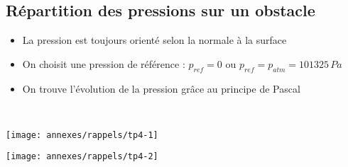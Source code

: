 \subsection*{Répartition des pressions sur un obstacle}
\begin{itemize}
	\item La pression est toujours orienté selon la normale à la surface
	\item On choisit une pression de référence : $p_{ref} = 0$ ou $p_{ref} = p_{atm} = 101325 \, Pa$
	\item On trouve l'évolution de la pression grâce au principe de Pascal
\end{itemize}
\ \\
\begin{minipage}{0.55 \textwidth}
	\begin{flushleft}
		\texttt{[image: annexes/rappels/tp4-1]}
	\end{flushleft}
\end{minipage}
\begin{minipage}{0.5 \textwidth}
	\begin{flushleft}
		\texttt{[image: annexes/rappels/tp4-2]}
	\end{flushleft}
\end{minipage}